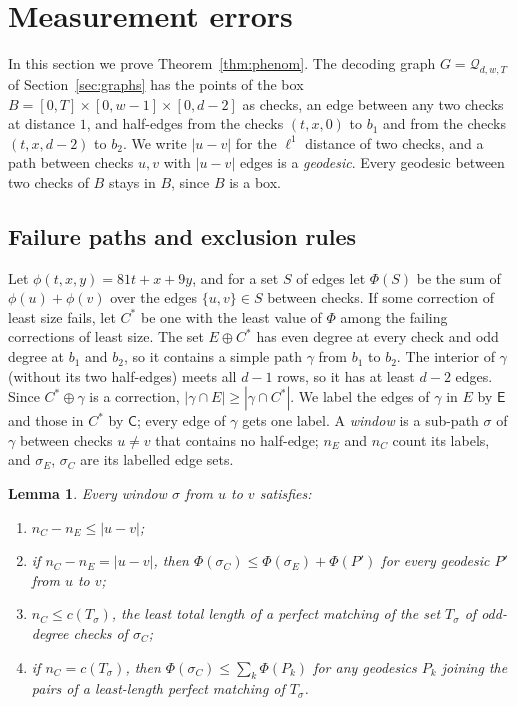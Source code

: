 \documentclass[11pt]{amsart}
\newtheorem{lemma}[theorem]{Lemma}
\theoremstyle{definition}
\theoremstyle{remark}
\numberwithin{equation}{section}
\begin{document}
\section{Measurement errors}\label{sec:phenom}

In this section we prove Theorem~\ref{thm:phenom}. The decoding graph $G=\mathcal Q_{d,w,T}$ of
Section~\ref{sec:graphs} has the points of the box $B=[0,T]\times[0,w-1]\times[0,d-2]$ as checks, an edge between any
two checks at distance $1$, and half-edges from the checks $(t,x,0)$ to $b_1$ and from the checks $(t,x,d-2)$ to $b_2$.
We write $|u-v|$ for the $\ell^1$ distance of two checks, and a path between checks $u,v$ with $|u-v|$ edges is a
\emph{geodesic}. Every geodesic between two checks of $B$ stays in
$B$, since $B$ is a box.

\subsection{Failure paths and exclusion rules}\label{phen:rules}
Let $\phi(t,x,y)=81t+x+9y$, and for a set $S$ of edges let $\Phi(S)$ be the sum of $\phi(u)+\phi(v)$ over the edges
$\{u,v\}\in S$ between checks. If some correction of least size fails, let $C^\ast$ be one with the least value of $\Phi$ among the failing
corrections of least size.
The set $E\oplus C^\ast$ has even degree at every check and odd degree at $b_1$ and $b_2$, so it contains a simple path
$\gamma$ from $b_1$ to $b_2$. The interior of $\gamma$ (without its two half-edges) meets all $d-1$ rows, so it has at
least $d-2$ edges. Since $C^\ast\oplus\gamma$ is a correction, $|\gamma\cap E|\ge|\gamma\cap C^\ast|$. We label the
edges of $\gamma$ in $E$ by $\mathsf E$ and those in $C^\ast$ by $\mathsf C$; every edge of $\gamma$ gets one label. A
\emph{window} is a sub-path $\sigma$ of $\gamma$ between checks $u\ne v$ that contains no half-edge; $n_E$ and $n_C$
count its labels, and $\sigma_E$, $\sigma_C$ are its labelled edge sets.

\begin{lemma}\label{phen:lem-rules}
Every window $\sigma$ from $u$ to $v$ satisfies:
\begin{enumerate}[label=\textup{(\roman*)}]
\item $n_C-n_E\le|u-v|$;
\item if $n_C-n_E=|u-v|$, then $\Phi(\sigma_C)\le\Phi(\sigma_E)+\Phi(P')$ for every geodesic $P'$ from $u$ to $v$;
\item $n_C\le c(T_\sigma)$, the least total length of a perfect matching of the set $T_\sigma$ of odd-degree checks of
  $\sigma_C$;
\item if $n_C=c(T_\sigma)$, then $\Phi(\sigma_C)\le\sum_k\Phi(P_k)$ for any geodesics $P_k$ joining the pairs of a
  least-length perfect matching of $T_\sigma$.
\end{enumerate}
\end{lemma}
\end{document}
